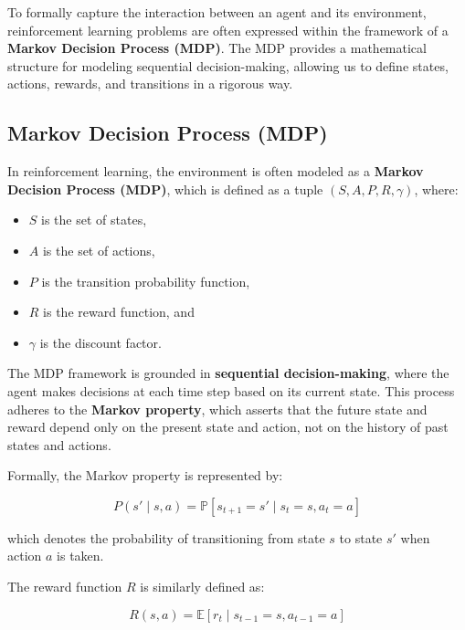 
To formally capture the interaction between an agent and its environment,
reinforcement learning problems are often expressed within the framework
of a \textbf{Markov Decision Process (MDP)}. The MDP provides a mathematical structure
for modeling sequential decision-making, allowing us to define states,
actions, rewards, and transitions in a rigorous way.


\subsection{Markov Decision Process (MDP)}

In reinforcement learning, the environment is often modeled as a \textbf{Markov
    Decision Process (MDP)}, which is defined as a tuple $(S, A, P, R, \gamma)$,
where:
\begin{itemize}
    \item \( S \) is the set of states,
    \item \( A \) is the set of actions,
    \item \( P \) is the transition probability function,
    \item \( R \) is the reward function, and
    \item \( \gamma \) is the discount factor.
\end{itemize}
 
The MDP framework is grounded in \textbf{sequential decision-making}, where the
agent makes decisions at each time step based on its current state. This
process adheres to the \textbf{Markov property}, which asserts that the future
state and reward depend only on the present state and action, not on the
history of past states and actions\cite{bg2}.

Formally, the Markov property is represented by:

\begin{equation}
    P(s'\mid s, a) = \mathbb{P}[s_{t+1} = s' \mid s_t = s, a_t = a]
\end{equation}

which denotes the probability of transitioning from state $s$ to state $s'$
when action $a$ is taken.

The reward function \( R \) is similarly defined as:

\begin{equation}
    R(s, a) = \mathbb{E}[r_t \mid s_{t-1} = s, a_{t-1} = a]
\end{equation}


